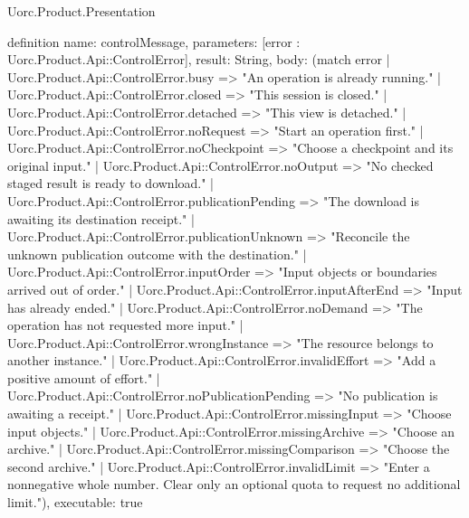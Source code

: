 \begin{lexlean}{Uorc.Product.Presentation}
\begin{semanticmodule}
definition{
  name: controlMessage,
  parameters: [error : Uorc.Product.Api::ControlError],
  result: String,
  body: (match error
    | Uorc.Product.Api::ControlError.busy => "An operation is already running."
    | Uorc.Product.Api::ControlError.closed => "This session is closed."
    | Uorc.Product.Api::ControlError.detached => "This view is detached."
    | Uorc.Product.Api::ControlError.noRequest => "Start an operation first."
    | Uorc.Product.Api::ControlError.noCheckpoint => "Choose a checkpoint and its original input."
    | Uorc.Product.Api::ControlError.noOutput => "No checked staged result is ready to download."
    | Uorc.Product.Api::ControlError.publicationPending => "The download is awaiting its destination receipt."
    | Uorc.Product.Api::ControlError.publicationUnknown => "Reconcile the unknown publication outcome with the destination."
    | Uorc.Product.Api::ControlError.inputOrder => "Input objects or boundaries arrived out of order."
    | Uorc.Product.Api::ControlError.inputAfterEnd => "Input has already ended."
    | Uorc.Product.Api::ControlError.noDemand => "The operation has not requested more input."
    | Uorc.Product.Api::ControlError.wrongInstance => "The resource belongs to another instance."
    | Uorc.Product.Api::ControlError.invalidEffort => "Add a positive amount of effort."
    | Uorc.Product.Api::ControlError.noPublicationPending => "No publication is awaiting a receipt."
    | Uorc.Product.Api::ControlError.missingInput => "Choose input objects."
    | Uorc.Product.Api::ControlError.missingArchive => "Choose an archive."
    | Uorc.Product.Api::ControlError.missingComparison => "Choose the second archive."
    | Uorc.Product.Api::ControlError.invalidLimit => "Enter a nonnegative whole number. Clear only an optional quota to request no additional limit."),
  executable: true
}


\end{semanticmodule}
\end{lexlean}
